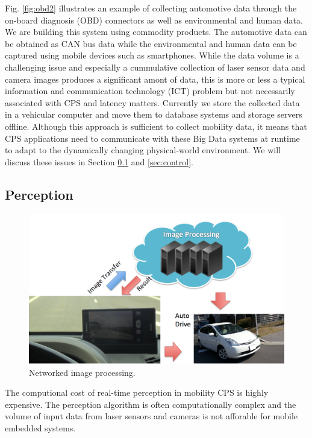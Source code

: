 Fig. \ref{fig:obd2} illustrates an example of collecting automotive data
through the on-board diagnosis (OBD) connectors as well as environmental
and human data.
We are building this system using commodity products. 
The automotive data can be obtained as CAN bus data while the
environmental and human data can be captured using mobile devices such
as smartphones.
While the data volume is a challenging issue and especially a
cummulative collection of laser sensor data and camera images produces a
significant amont of data, this is more or less a typical information
and communication technology (ICT) problem but not necessarily
associated with CPS and latency matters.
Currently we store the collected data in a vehicular computer and move
them to database systems and storage servers offline.
Although this approach is sufficient to collect mobility data, it means
that CPS applications need to communicate with these Big Data systems at
runtime to adapt to the dynamically changing physical-world environment.
We will discuss these issues in Section \ref{sec:perception} and
\ref{sec:control}.

\subsection{Perception}
\label{sec:perception}

\begin{figure}[!t]
 \centering
 \includegraphics[width=\hsize]{fig/TIPIC.pdf}
 \caption{Networked image processing.}
 \label{fig:tipic}
\end{figure}

The computional cost of real-time perception in mobility CPS is highly
expensive.
The perception algorithm is often computationally complex and the volume
of input data from laser sensors and cameras is not afforable for mobile
embedded systems.

